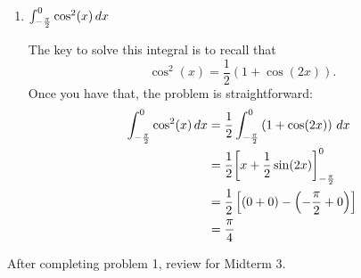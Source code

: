 \documentclass[handout,nooutcomes]{ximera}
\begin{document}
\begin{problem}
\begin{enumerate}
	\item  $\int_{- \frac{\pi}{2}}^0 \cos^2 (x) \,d x$
		\begin{freeResponse}
		The key to solve this integral is to recall that
		$$ \cos^2 (x) = \frac{1}{2} \left( 1 + \cos(2x) \right) .$$
		Once you have that, the problem is straightforward:
			\begin{align*}
			\int_{- \frac{\pi}{2}}^0 \cos^2 (x) \,d x &= \frac{1}{2} \int_{- \frac{\pi}{2}}^0 \left( 1 + \cos(2x) \right) \,d x  \\
			&= \frac{1}{2} \bigg[  x + \frac{1}{2} \sin(2x)   \bigg]_{- \frac{\pi}{2}}^0  \\
			&= \frac{1}{2} \left[ (0 + 0) - \left(- \frac{\pi}{2} + 0 \right) \right]  \\
			&= \frac{\pi}{4}
			\end{align*}
		\end{freeResponse}
		
		
		
	\end{enumerate}
		
		
\end{problem}



After completing problem 1, review for Midterm 3.


















	
	
	
	
	
	
	
	
	

	










								
				
				
	
\end{document}
